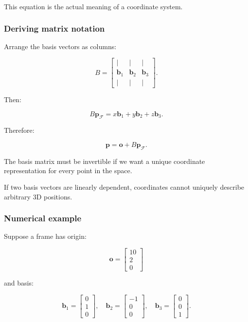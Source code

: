 This equation is the actual meaning of a coordinate system.

\subsubsection{Deriving matrix notation}\label{02-foundations-ii-ch032-deriving-matrix-notation}

\hypertarget{02-foundations-ii-ch032-deriving-matrix-notation}{}

Arrange the basis vectors as columns:

\[
 B= \begin{bmatrix} |&|&|\\ \mathbf b_1&\mathbf b_2&\mathbf b_3\\ |&|&| \end{bmatrix}.
\]

Then:

\[
 B\mathbf p_{\mathcal F} = x\mathbf b_1+y\mathbf b_2+z\mathbf b_3.
\]

Therefore:

\[
 \boxed{ \mathbf p=\mathbf o+B\mathbf p_{\mathcal F} }.
\]

The basis matrix must be invertible if we want a unique coordinate representation for every point in the space.

If two basis vectors are linearly dependent, coordinates cannot uniquely describe arbitrary 3D positions.

\subsubsection{Numerical example}\label{02-foundations-ii-ch032-numerical-example}

\hypertarget{02-foundations-ii-ch032-numerical-example}{}

Suppose a frame has origin:

\[
 \mathbf o= \begin{bmatrix}10\\2\\0\end{bmatrix}
\]

and basis:

\[
 \mathbf b_1= \begin{bmatrix}0\\1\\0\end{bmatrix},\quad \mathbf b_2= \begin{bmatrix}-1\\0\\0\end{bmatrix},\quad \mathbf b_3= \begin{bmatrix}0\\0\\1\end{bmatrix}.
\]

